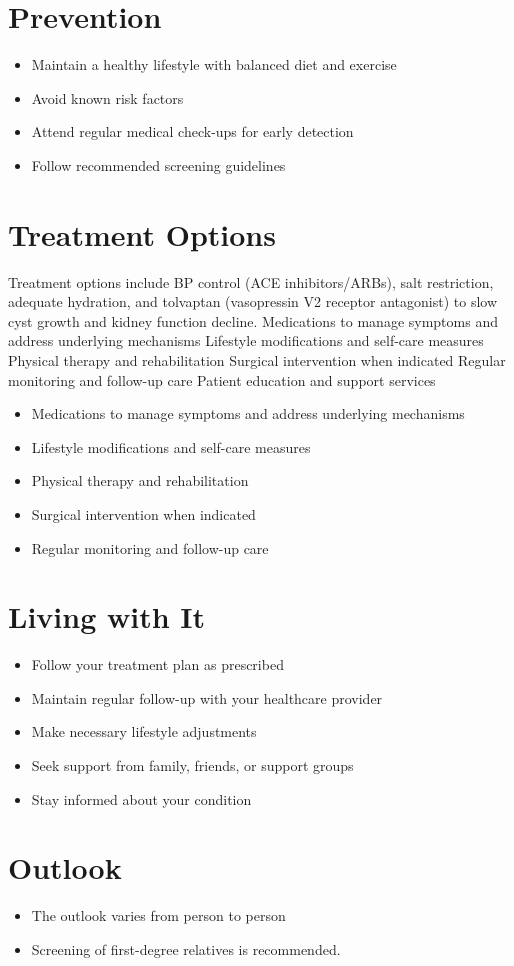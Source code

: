 \section{Prevention}
\begin{itemize}[noitemsep]
  \item Maintain a healthy lifestyle with balanced diet and exercise
  \item Avoid known risk factors
  \item Attend regular medical check-ups for early detection
  \item Follow recommended screening guidelines
\end{itemize}
\section{Treatment Options}
Treatment options include BP control (ACE inhibitors/ARBs), salt restriction, adequate hydration, and tolvaptan (vasopressin V2 receptor antagonist) to slow cyst growth and kidney function decline. Medications to manage symptoms and address underlying mechanisms Lifestyle modifications and self-care measures Physical therapy and rehabilitation Surgical intervention when indicated Regular monitoring and follow-up care Patient education and support services

\begin{itemize}[noitemsep]
  \item Medications to manage symptoms and address underlying mechanisms
  \item Lifestyle modifications and self-care measures
  \item Physical therapy and rehabilitation
  \item Surgical intervention when indicated
  \item Regular monitoring and follow-up care
\end{itemize}
\section{Living with It}
\begin{itemize}[noitemsep]
  \item Follow your treatment plan as prescribed
  \item Maintain regular follow-up with your healthcare provider
  \item Make necessary lifestyle adjustments
  \item Seek support from family, friends, or support groups
  \item Stay informed about your condition
\end{itemize}
\section{Outlook}
\begin{itemize}[noitemsep]
  \item The outlook varies from person to person
  \item Screening of first-degree relatives is recommended.
\end{itemize}
